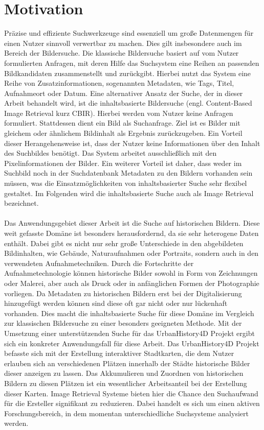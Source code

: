 \section*{Motivation}
Präzise und effiziente Suchwerkzeuge sind essenziell um große Datenmengen für einen Nutzer sinnvoll verwertbar zu machen. Dies gilt insbesondere auch im Bereich der Bildersuche. Die klassische Bildersuche basiert auf vom Nutzer formulierten Anfragen, mit deren Hilfe das Suchsystem eine Reihen an passenden Bildkandidaten zusammenstellt und zurückgibt. Hierbei nutzt das System eine Reihe von Zusatzinformationen, sogenannten Metadaten, wie Tags, Titel, Aufnahmeort oder Datum. Eine alternativer Ansatz der Suche, der in dieser Arbeit behandelt wird, ist die inhaltsbasierte Bildersuche (engl. Content-Based Image Retrieval kurz CBIR). Hierbei werden vom Nutzer keine Anfragen formuliert. Stattdessen dient ein Bild als Suchanfrage. Ziel ist es Bilder mit gleichem oder ähnlichem Bildinhalt als Ergebnis zurückzugeben. Ein Vorteil dieser Herangehensweise ist, dass der Nutzer keine Informationen über den Inhalt des Suchbildes benötigt. Das System arbeitet ausschließlich mit den Pixelinformationen der Bilder. Ein weiterer Vorteil ist daher, dass weder im Suchbild noch in der Suchdatenbank Metadaten zu den Bildern vorhanden sein müssen, was die Einsatzmöglichkeiten von inhaltsbasierter Suche sehr flexibel gestaltet. Im Folgenden wird die inhaltsbasierte Suche auch als Image Retrieval bezeichnet.
\\\\
Das Anwendungsgebiet dieser Arbeit ist die Suche auf historischen Bildern. Diese weit gefasste Domäne ist besonders herausfordernd, da sie sehr heterogene Daten enthält. Dabei gibt es nicht nur sehr große Unterschiede in den abgebildeten Bildinhalten, wie Gebäude, Naturaufnahmen oder Portraits, sondern auch in den verwendeten Aufnahmetechniken. Durch die Fortschritte der Aufnahmetechnologie können historische Bilder sowohl in Form von Zeichnungen oder Malerei, aber auch als Druck oder in anfänglichen Formen der Photographie vorliegen. Da Metadaten zu historischen Bildern erst bei der Digitalisierung hinzugefügt werden können sind diese oft gar nicht oder nur lückenhaft vorhanden. Dies macht die inhaltsbasierte Suche für diese Domäne im Vergleich zur klassischen Bildersuche zu einer besonders geeigneten Methode. Mit der Umsetzung einer unterstützenden Suche für das UrbanHistory4D Projekt \cite{urbanhistory4d} ergibt sich ein konkreter Anwendungsfall für diese Arbeit. Das UrbanHistory4D Projekt befasste sich mit der Erstellung interaktiver Stadtkarten, die dem Nutzer erlauben sich an verschiedenen Plätzen innerhalb der Städte historische Bilder dieser anzeigen zu lassen. Das Akkumulieren und Zuordnen von historischen Bildern zu diesen Plätzen ist ein wesentlicher Arbeitsanteil bei der Erstellung dieser Karten. Image Retrieval Systeme bieten hier die Chance den Suchaufwand für die Ersteller signifikant zu reduzieren. Dabei handelt es sich um einen aktiven Forschungsbereich, in dem momentan unterschiedliche Suchsysteme analysiert werden. 
